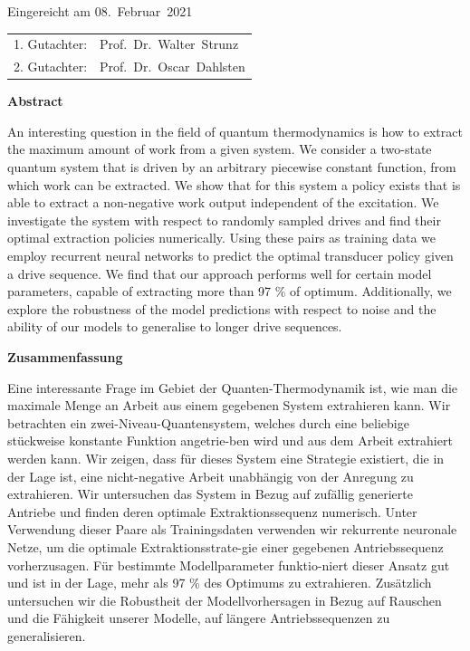 \thispagestyle{empty}\vspace*{48em}

Eingereicht am 08.~Februar~2021\vspace{1.5em}
\par{\large\begin{tabular}{ll}
 1. Gutachter: & Prof.~Dr.~Walter~Strunz \\
 2. Gutachter: & Prof.~Dr.~Oscar~Dahlsten \\
\end{tabular}}


\newpage
\begin{center}\large\bfseries Abstract\end{center}
%
%
An interesting question in the field of quantum thermodynamics is how to extract the maximum amount of work from a given system.
We consider a two-state quantum system that is driven by an arbitrary piecewise constant function, from which work can be extracted.
We show that for this system a policy exists that is able to extract a non-negative work output independent of the excitation.
We investigate the system with respect to randomly sampled drives and find their optimal extraction policies numerically.
Using these pairs as training data we employ recurrent neural networks to predict the optimal transducer policy given a drive sequence.
We find that our approach performs well for certain model parameters, capable of extracting more than 97 \% of optimum.
Additionally, we explore the robustness of the model predictions with respect to noise and the ability of our models to generalise to longer drive sequences.

\vspace{10em}
\begin{center}\large\bfseries Zusammenfassung\end{center}
Eine interessante Frage im Gebiet der Quanten-Thermodynamik ist, wie man die maximale Menge an Arbeit aus einem gegebenen System extrahieren kann.
Wir betrachten ein zwei-Niveau-Quantensystem, welches durch eine beliebige stückweise konstante Funktion angetrie-ben wird und aus dem Arbeit extrahiert werden kann.
Wir zeigen, dass für dieses System eine Strategie existiert, die in der Lage ist, eine nicht-negative Arbeit unabhängig von der Anregung zu extrahieren.
Wir untersuchen das System in Bezug auf zufällig generierte Antriebe und finden deren optimale Extraktionssequenz numerisch.
Unter Verwendung dieser Paare als Trainingsdaten verwenden wir rekurrente neuronale Netze, um die optimale Extraktionsstrate-gie einer gegebenen Antriebssequenz vorherzusagen.
Für bestimmte Modellparameter funktio-niert dieser Ansatz gut und ist in der Lage, mehr als 97 \% des Optimums zu extrahieren.
Zusätzlich untersuchen wir die Robustheit der Modellvorhersagen in Bezug auf Rauschen und die Fähigkeit unserer Modelle, auf längere Antriebssequenzen zu generalisieren.
 
